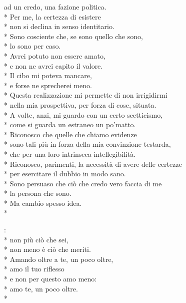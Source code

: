\documentclass[12pt]{book}
\begin{document}
ad un credo, una fazione politica. \\*
\newpage
Per me, la certezza di esistere \\*
non si declina in senso identitario. \\*
Sono cosciente che, se sono quello che sono,\\*
lo sono per caso. \\*
Avrei potuto non essere amato, \\*
e non ne avrei capito il valore. \\*
Il cibo mi poteva mancare, \\*
e forse ne sprecherei meno. \\*
Questa realizzazione mi permette di non irrigidirmi \\*
nella mia prospettiva, per forza di cose, situata. \\*
A volte, anzi, mi guardo con un certo scetticismo, \\*
come si guarda un estraneo un po'matto. \\*
Riconosco che quelle che chiamo evidenze \\*
sono tali più in forza della mia convinzione testarda, \\*
che per una loro intrinseca intellegibilità. \\*
Riconosco, parimenti, la necessità di avere delle certezze \\*
per esercitare il dubbio in modo sano. \\*
Sono persuaso che ciò che credo vero faccia di me \\*
la persona che sono. \\*
Ma cambio spesso idea. \\*


\mainmatter

\begin{poem}{}{}

\settowidth{\versewidth}{non meno è ciò che meriti.}

\begin{altverse}
:\\*
non più ciò che sei, \\*
non meno è ciò che meriti. \\*
Amando oltre a te, un poco oltre, \\*
amo il tuo riflesso \\*
e non per questo amo meno: \\*
amo te, un poco oltre. \\*
\end{altverse}

\end{poem}
\end{document}

